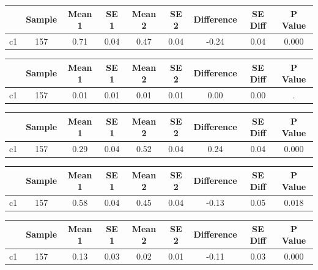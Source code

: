 {
\def\sym#1{\ifmmode^{#1}\else\(^{#1}\)\fi}
\begin{tabular}{l*{1}{cccccccc}}
\hline\hline
            &      Sample&      Mean 1&        SE 1&      Mean 2&        SE 2&  Difference&     SE Diff&     P Value\\
\hline
c1          &         157&        0.71&        0.04&        0.47&        0.04&       -0.24&        0.04&       0.000\\
\hline\hline
\end{tabular}
}
{
\def\sym#1{\ifmmode^{#1}\else\(^{#1}\)\fi}
\begin{tabular}{l*{1}{cccccccc}}
\hline\hline
            &      Sample&      Mean 1&        SE 1&      Mean 2&        SE 2&  Difference&     SE Diff&     P Value\\
\hline
c1          &         157&        0.01&        0.01&        0.01&        0.01&        0.00&        0.00&           .\\
\hline\hline
\end{tabular}
}
{
\def\sym#1{\ifmmode^{#1}\else\(^{#1}\)\fi}
\begin{tabular}{l*{1}{cccccccc}}
\hline\hline
            &      Sample&      Mean 1&        SE 1&      Mean 2&        SE 2&  Difference&     SE Diff&     P Value\\
\hline
c1          &         157&        0.29&        0.04&        0.52&        0.04&        0.24&        0.04&       0.000\\
\hline\hline
\end{tabular}
}
{
\def\sym#1{\ifmmode^{#1}\else\(^{#1}\)\fi}
\begin{tabular}{l*{1}{cccccccc}}
\hline\hline
            &      Sample&      Mean 1&        SE 1&      Mean 2&        SE 2&  Difference&     SE Diff&     P Value\\
\hline
c1          &         157&        0.58&        0.04&        0.45&        0.04&       -0.13&        0.05&       0.018\\
\hline\hline
\end{tabular}
}
{
\def\sym#1{\ifmmode^{#1}\else\(^{#1}\)\fi}
\begin{tabular}{l*{1}{cccccccc}}
\hline\hline
            &      Sample&      Mean 1&        SE 1&      Mean 2&        SE 2&  Difference&     SE Diff&     P Value\\
\hline
c1          &         157&        0.13&        0.03&        0.02&        0.01&       -0.11&        0.03&       0.000\\
\hline\hline
\end{tabular}
}
